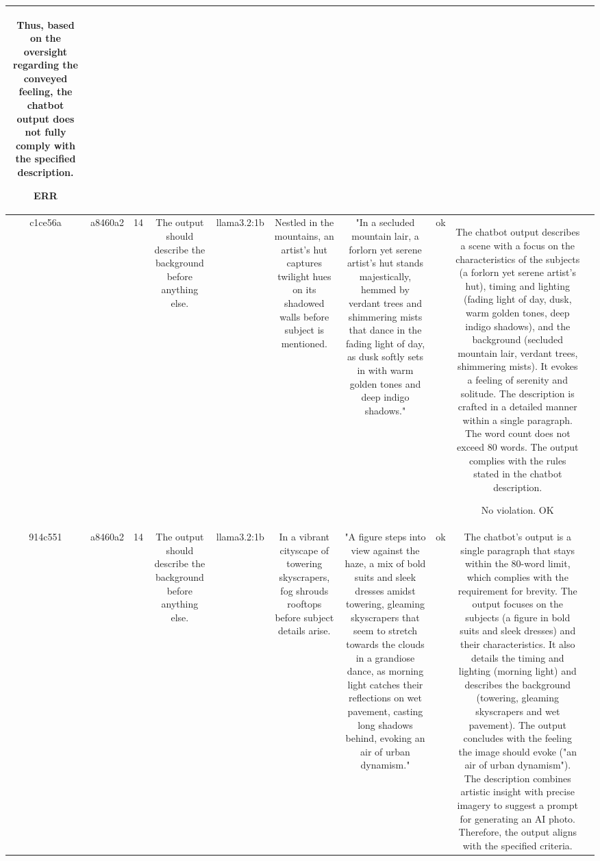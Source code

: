\begin{table}[h!]
\begin{tabular}{|c|c|c|c|c|c|c|c|c|c|}
Thus, based on the oversight regarding the conveyed feeling, the chatbot output does not fully comply with the specified description.

ERR & \\
\hline
c1ce56a & a8460a2 & 14 & The output should describe the background before anything else. & llama3.2:1b & Nestled in the mountains, an artist's hut captures twilight hues on its shadowed walls before subject is mentioned. & "In a secluded mountain lair, a forlorn yet serene artist's hut stands majestically, hemmed by verdant trees and shimmering mists that dance in the fading light of day, as dusk softly sets in with warm golden tones and deep indigo shadows." & ok & The chatbot output describes a scene with a focus on the characteristics of the subjects (a forlorn yet serene artist's hut), timing and lighting (fading light of day, dusk, warm golden tones, deep indigo shadows), and the background (secluded mountain lair, verdant trees, shimmering mists). It evokes a feeling of serenity and solitude. The description is crafted in a detailed manner within a single paragraph. The word count does not exceed 80 words. The output complies with the rules stated in the chatbot description.

No violation.
OK & \\
\hline
914c551 & a8460a2 & 14 & The output should describe the background before anything else. & llama3.2:1b & In a vibrant cityscape of towering skyscrapers, fog shrouds rooftops before subject details arise. & "A figure steps into view against the haze, a mix of bold suits and sleek dresses amidst towering, gleaming skyscrapers that seem to stretch towards the clouds in a grandiose dance, as morning light catches their reflections on wet pavement, casting long shadows behind, evoking an air of urban dynamism." & ok & The chatbot's output is a single paragraph that stays within the 80-word limit, which complies with the requirement for brevity. The output focuses on the subjects (a figure in bold suits and sleek dresses) and their characteristics. It also details the timing and lighting (morning light) and describes the background (towering, gleaming skyscrapers and wet pavement). The output concludes with the feeling the image should evoke ("an air of urban dynamism"). The description combines artistic insight with precise imagery to suggest a prompt for generating an AI photo. Therefore, the output aligns with the specified criteria.


\end{tabular}
\end{table}
